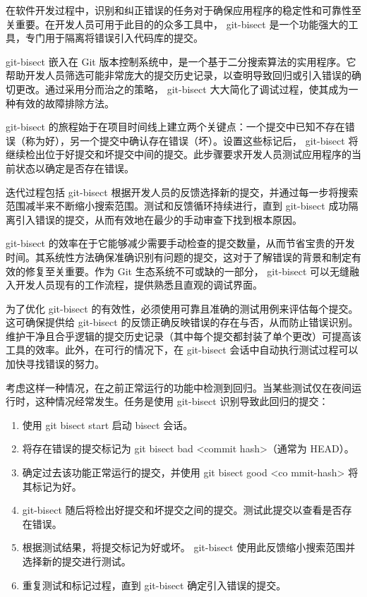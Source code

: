 在软件开发过程中，识别和纠正错误的任务对于确保应用程序的稳定性和可靠性至关重要。在开发人员可用于此目的的众多工具中， git-bisect 是一个功能强大的工具，专门用于隔离将错误引入代码库的提交。

git-bisect 嵌入在 Git 版本控制系统中，是一个基于二分搜索算法的实用程序。它帮助开发人员筛选可能非常庞大的提交历史记录，以查明导致回归或引入错误的确切更改。通过采用分而治之的策略， git-bisect 大大简化了调试过程，使其成为一种有效的故障排除方法。

git-bisect 的旅程始于在项目时间线上建立两个关键点：一个提交中已知不存在错误（称为好），另一个提交中确认存在错误（坏）。设置这些标记后， git-bisect 将继续检出位于好提交和坏提交中间的提交。此步骤要求开发人员测试应用程序的当前状态以确定是否存在错误。

迭代过程包括 git-bisect 根据开发人员的反馈选择新的提交，并通过每一步将搜索范围减半来不断缩小搜索范围。测试和反馈循环持续进行，直到 git-bisect 成功隔离引入错误的提交，从而有效地在最少的手动审查下找到根本原因。

git-bisect 的效率在于它能够减少需要手动检查的提交数量，从而节省宝贵的开发时间。其系统性方法确保准确识别有问题的提交，这对于了解错误的背景和制定有效的修复至关重要。作为 Git 生态系统不可或缺的一部分， git-bisect 可以无缝融入开发人员现有的工作流程，提供熟悉且直观的调试界面。

为了优化 git-bisect 的有效性，必须使用可靠且准确的测试用例来评估每个提交。这可确保提供给 git-bisect 的反馈正确反映错误的存在与否，从而防止错误识别。维护干净且合乎逻辑的提交历史记录（其中每个提交都封装了单个更改）可提高该工具的效率。此外，在可行的情况下，在 git-bisect 会话中自动执行测试过程可以加快寻找错误的努力。

考虑这样一种情况，在之前正常运行的功能中检测到回归。当某些测试仅在夜间运行时，这种情况经常发生。任务是使用 git-bisect 识别导致此回归的提交：

\begin{enumerate}
\item
使用 git bisect start 启动 bisect 会话。

\item
将存在错误的提交标记为 git bisect bad <commit hash>（通常为 HEAD）。

\item
确定过去该功能正常运行的提交，并使用 git bisect good <co mmit-hash> 将其标记为好。

\item
git-bisect 随后将检出好提交和坏提交之间的提交。测试此提交以查看是否存在错误。

\item
根据测试结果，将提交标记为好或坏。 git-bisect 使用此反馈缩小搜索范围并选择新的提交进行测试。

\item
重复测试和标记过程，直到 git-bisect 确定引入错误的提交。
\end{enumerate}

